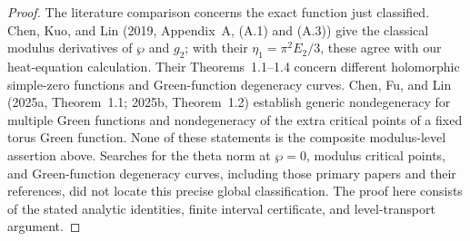 \begin{proof}
The literature comparison concerns the exact function just
classified. Chen, Kuo, and Lin (2019, Appendix~A, (A.1) and
(A.3)) give the classical modulus derivatives of \(\wp\) and
\(g_2\); with their \(\eta_1=\pi^2E_2/3\), these agree with our
heat-equation calculation. Their Theorems~1.1--1.4 concern different
holomorphic simple-zero functions and Green-function degeneracy
curves. Chen, Fu, and Lin (2025a, Theorem~1.1; 2025b,
Theorem~1.2) establish generic nondegeneracy for multiple Green
functions and nondegeneracy of the extra critical points of a fixed
torus Green function. None of these statements is the composite
modulus-level assertion above. Searches for the theta norm at
\(\wp=0\), modulus critical points, and Green-function degeneracy
curves, including those primary papers and their references, did
not locate this precise global classification. The proof here consists of the stated analytic identities, finite
interval certificate, and level-transport argument.
\nocite{Buchdahl1999,Grauert1960D,Grauert1963ErratumD,CornulierChabauty,LinWang2010D,ChenKuoLin2019D,ChenFuLin2025GenericD,ChenFuLin2025HitchinD}
\end{proof}



